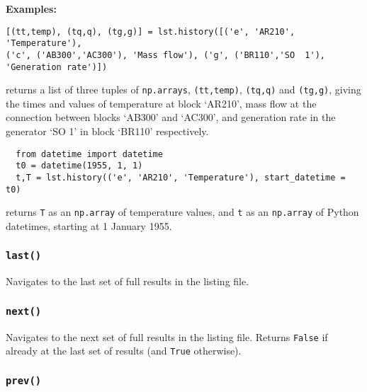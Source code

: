 \textbf{Examples:}

\begin{lstlisting}
[(tt,temp), (tq,q), (tg,g)] = lst.history([('e', 'AR210', 'Temperature'),
('c', ('AB300','AC300'), 'Mass flow'), ('g', ('BR110','SO  1'), 'Generation rate')])
\end{lstlisting}

returns a list of three tuples of \texttt{np.arrays}, \texttt{(tt,temp)}, \texttt{(tq,q)} and \texttt{(tg,g)}, giving the times and values of temperature at block `AR210', mass flow at the connection between blocks `AB300' and `AC300', and generation rate in the generator `SO  1' in block `BR110' respectively.

\begin{lstlisting}
  from datetime import datetime
  t0 = datetime(1955, 1, 1)
  t,T = lst.history(('e', 'AR210', 'Temperature'), start_datetime = t0)
\end{lstlisting}

returns \texttt{T} as an \texttt{np.array} of temperature values, and \texttt{t} as an \texttt{np.array} of Python datetimes, starting at 1 January 1955.

\begin{snugshade}
\subsubsection{\texttt{last()}}
\end{snugshade}
\label{sec:t2listing:last}

Navigates to the last set of full results in the listing file.

\begin{snugshade}
\subsubsection{\texttt{next()}}
\end{snugshade}
\label{sec:t2listing:next}

Navigates to the next set of full results in the listing file.  Returns \texttt{False} if already at the last set of results (and \texttt{True} otherwise).

\begin{snugshade}
\subsubsection{\texttt{prev()}}
\end{snugshade}
\label{sec:t2listing:prev}

